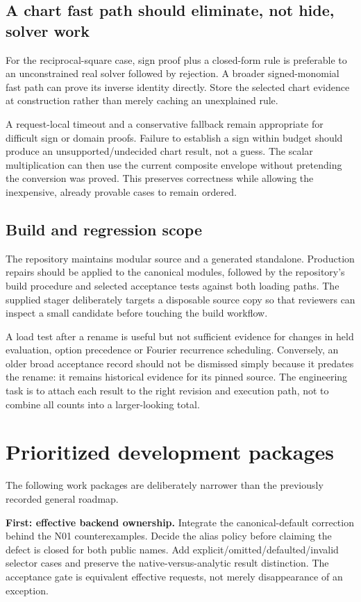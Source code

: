 \documentclass[11pt,a4paper]{article}
\begin{document}
\subsection{A chart fast path should eliminate, not hide, solver work}
For the reciprocal-square case, sign proof plus a closed-form rule is preferable to an unconstrained real solver followed by rejection. A broader signed-monomial fast path can prove its inverse identity directly. Store the selected chart evidence at construction rather than merely caching an unexplained rule.

A request-local timeout and a conservative fallback remain appropriate for difficult sign or domain proofs. Failure to establish a sign within budget should produce an unsupported/undecided chart result, not a guess. The scalar multiplication can then use the current composite envelope without pretending the conversion was proved. This preserves correctness while allowing the inexpensive, already provable cases to remain ordered.

\subsection{Build and regression scope}
The repository maintains modular source and a generated standalone. Production repairs should be applied to the canonical modules, followed by the repository's build procedure and selected acceptance tests against both loading paths. The supplied stager deliberately targets a disposable source copy so that reviewers can inspect a small candidate before touching the build workflow.

A load test after a rename is useful but not sufficient evidence for changes in held evaluation, option precedence or Fourier recurrence scheduling. Conversely, an older broad acceptance record should not be dismissed simply because it predates the rename: it remains historical evidence for its pinned source. The engineering task is to attach each result to the right revision and execution path, not to combine all counts into a larger-looking total.\cite{native-plan,review-register}

\section{Prioritized development packages}
\label{sec:roadmap}
The following work packages are deliberately narrower than the previously recorded general roadmap.

\textbf{First: effective backend ownership.} Integrate the canonical-default correction behind the N01 counterexamples. Decide the alias policy before claiming the defect is closed for both public names. Add explicit/omitted/defaulted/invalid selector cases and preserve the native-versus-analytic result distinction. The acceptance gate is equivalent effective requests, not merely disappearance of an exception.
\end{document}
